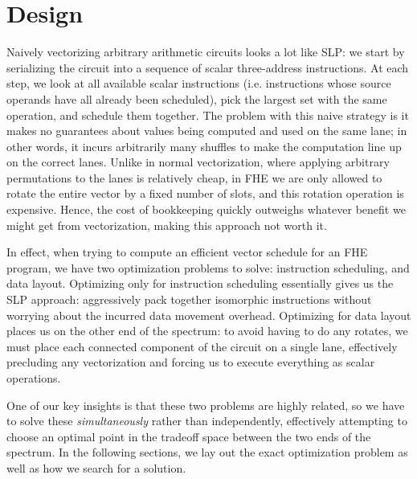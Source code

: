 \section{Design}\label{sec:design}
Naively vectorizing arbitrary arithmetic circuits looks a lot like SLP: we start by serializing the circuit into a sequence of scalar three-address instructions.
At each step, we look at all available scalar instructions (i.e. instructions whose source operands have all already been scheduled), pick the largest set with the same operation, and schedule them together.
The problem with this naive strategy is it makes no guarantees about values being computed and used on the same lane; in other words, it incurs arbitrarily many shuffles to make the computation line up on the correct lanes.
Unlike in normal vectorization, where applying arbitrary permutations to the lanes is relatively cheap, in FHE we are only allowed to rotate the entire vector by a fixed number of slots, and this rotation operation is expensive.
Hence, the cost of bookkeeping quickly outweighs whatever benefit we might get from vectorization, making this approach not worth it.

In effect, when trying to compute an efficient vector schedule  for an FHE program, we have two optimization problems to solve: instruction scheduling, and data layout.
Optimizing only for instruction scheduling essentially gives us the SLP approach: aggressively pack together isomorphic instructions without worrying about the incurred data movement overhead.
Optimizing for data layout places us on the other end of the spectrum: to avoid having to do any rotates, we must place each connected component of the circuit on a single lane, effectively precluding any vectorization and forcing us to execute everything as scalar operations.

One of our key insights is that these two problems are highly related, so we have to solve these {\em simultaneously} rather than independently, effectively attempting to choose an optimal point in the tradeoff space between the two ends of the spectrum.
In the following sections, we lay out the exact optimization problem as well as how we search for a solution. 


